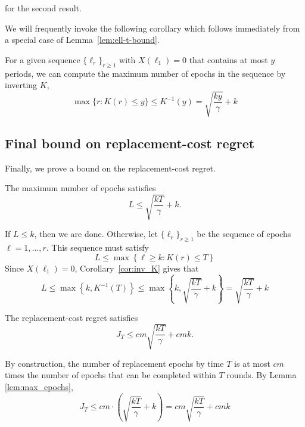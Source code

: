 \documentclass[opre,blindrev]{informs3}
\begin{document}
\begin{APPENDICES}
    for the second result.
\Halmos

We will frequently invoke the following corollary which follows immediately from  a special case of Lemma~\ref{lem:ell-t-bound}. 
\begin{corollary}[Inverse of \(K(r)\) with \(X(\ell_1)=0\)]\label{cor:inv_K}
    For a given sequence \(\{\ell_r\}_{r\geq 1}\) with \(X(\ell_1)=0\) that contains at most \(y\) periods, we can compute the maximum number of epochs in the sequence by inverting \(K\),
    \[\max\{r: K(r)\leq y\}\leq K^{-1}(y)=\sqrt{\frac{ky}{\gamma }}+k\]
\end{corollary}
%  

\subsection{Final bound on replacement-cost regret}
Finally, we prove a bound on the replacement-cost regret.
\begin{lemma}\label{lem:max_epochs}
    The maximum number of epochs satisfies
    \[
        L \leq \sqrt{\frac{kT}{\gamma}}+k.
    \]
\end{lemma}
    If \(L\leq k\), then we are done. Otherwise, let \(\{\ell_r\}_{r\geq 1}\) be the sequence of epochs \(\ell=1,\dots,r\). This sequence must satisfy
    \[L \leq \max\left\{\ell\geq k: K(r)\leq T\right\}\]
    Since \(X(\ell_1)=0\), Corollary~\ref{cor:inv_K} gives that
    \[L\leq \max\left\{k, K^{-1}(T)\right\}\leq \max\left\{k, \sqrt{\frac{kT}{\gamma }}+k\right\}= \sqrt{\frac{kT}{\gamma}}+k\]
\Halmos  

\begin{lemma}\label{lem:sc-bound-final}
    The replacement-cost regret satisfies
    \[
        J_T \leq cm\sqrt{\frac{kT}{\gamma}}+cmk.
    \]
\end{lemma}
    By construction, the number of replacement epochs by time \(T\) is at most \(cm\) times the number of epochs that can be completed within \(T\) rounds. By Lemma \ref{lem:max_epochs},
    \[J_T \leq cm\cdot \left(\sqrt{\frac{kT}{\gamma }}+k\right)=cm\sqrt{\frac{kT}{\gamma}}+cmk\]
\Halmos  


\end{APPENDICES}
\end{document}
